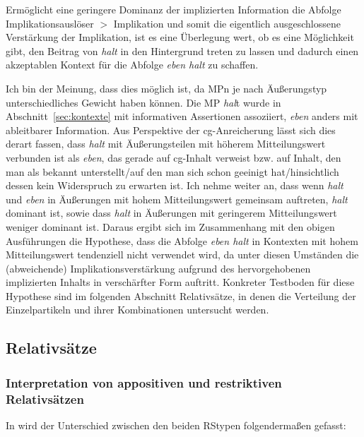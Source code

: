 Ermöglicht eine geringere Dominanz der implizierten Information die Abfolge Implikationsauslöser $>$ Implikation und somit die eigentlich ausgeschlossene Verstärkung der Implikation, ist es eine Überlegung wert, ob es eine Möglichkeit gibt, den Beitrag von \textit{halt} in den Hintergrund treten zu lassen und dadurch einen akzeptablen Kontext für die Abfolge \textit{eben halt} zu schaffen.

Ich bin der Meinung, dass dies möglich ist, da MPn je nach Äußerungstyp unterschiedliches Gewicht haben können. Die MP \textit{hal}t wurde in Abschnitt~\ref{sec:kontexte} mit informativen Assertionen assoziiert, \textit{eben} anders mit ableitbarer Information. Aus Perspektive der cg-Anreicherung lässt sich dies derart fassen, dass \textit{halt} mit Äußerungsteilen mit höherem Mitteilungswert verbunden ist als \textit{eben}, das gerade auf cg-Inhalt verweist bzw. auf Inhalt, den man als bekannt unterstellt/auf den man sich schon geeinigt hat/hinsichtlich dessen kein Widerspruch zu erwarten ist. Ich nehme weiter an, dass wenn \textit{halt} und \textit{eben} in Äußerungen mit hohem Mitteilungswert gemeinsam auftreten, \textit{halt} dominant ist, sowie dass \textit{halt} in Äußerungen mit geringerem Mitteilungswert weniger dominant ist. Daraus ergibt sich im Zusammenhang mit den obigen Ausführungen die Hypothese, dass die Abfolge \textit{eben halt} in Kontexten mit hohem Mitteilungswert tendenziell nicht verwendet wird, da unter diesen Umständen die (abweichende) Implikationsverstärkung aufgrund des hervorgehobenen implizierten Inhalts in verschärfter Form auftritt. Konkreter Testboden für diese Hypothese sind im folgenden Abschnitt Relativsätze, in denen die Verteilung der Einzelpartikeln und ihrer Kombinationen untersucht werden.

\subsection{Relativsätze}
\label{sec:rs}
\subsubsection{Interpretation von appositiven und restriktiven Relativsätzen} 
\label{sec:interrs}
In \citet[15]{Bluehdorn2007} wird der Unterschied zwischen den beiden RStypen folgendermaßen gefasst: 

